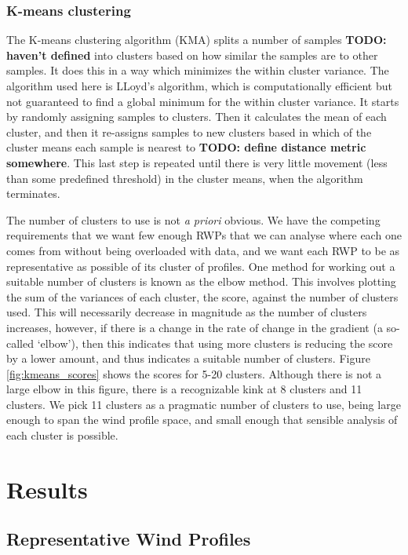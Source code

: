 \documentclass{article}
\newcommand\todo[1]{\textbf{TODO: #1}}
\begin{document}
\subsubsection{K-means clustering}

The K-means clustering algorithm (KMA) splits a number of samples \todo{haven't defined} into clusters based on how similar the samples are to other samples. It does this in a way which minimizes the within cluster variance. The algorithm used here is LLoyd's algorithm, which is computationally efficient but not guaranteed to find a global minimum for the within cluster variance. It starts by randomly assigning samples to clusters. Then it calculates the mean of each cluster, and then it re-assigns samples to new clusters based in which of the cluster means each sample is nearest to \todo{define distance metric somewhere}. This last step is repeated until there is very little movement (less than some predefined threshold) in the cluster means, when the algorithm terminates.

The number of clusters to use is not \textit{a priori} obvious. We have the competing requirements that we want few enough RWPs that we can analyse where each one comes from without being overloaded with data, and we want each RWP to be as representative as possible of its cluster of profiles. One method for working out a suitable number of clusters is known as the elbow method. This involves plotting the sum of the variances of each cluster, the score, against the number of clusters used. This will necessarily decrease in magnitude as the number of clusters increases, however, if there is a change in the rate of change in the gradient (a so-called `elbow'), then this indicates that using more clusters is reducing the score by a lower amount, and thus indicates a suitable number of clusters. Figure \ref{fig:kmeans_scores} shows the scores for 5-20 clusters. Although there is not a large elbow in this figure, there is a recognizable kink at 8 clusters and 11 clusters. We pick 11 clusters as a pragmatic number of clusters to use, being large enough to span the wind profile space, and small enough that sensible analysis of each cluster is possible.

\section{Results}

\subsection{Representative Wind Profiles}
\end{document}
